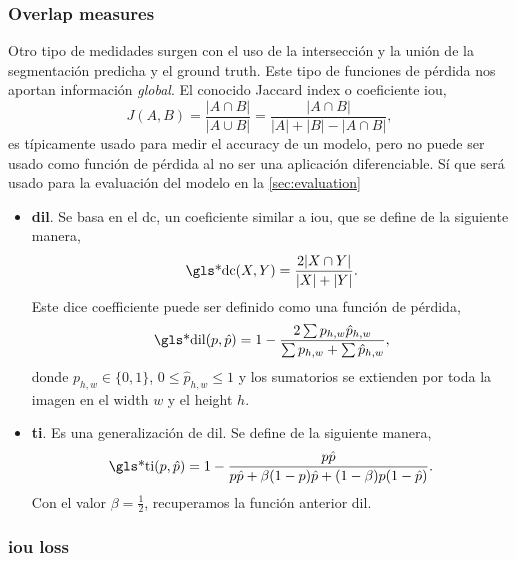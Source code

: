 \subsubsection{Overlap measures}
Otro tipo de medidades surgen con el uso de la intersección y la unión de la
segmentación predicha y el ground truth. Este tipo de funciones de pérdida nos
aportan información \emph{global}. El conocido Jaccard index o coeficiente \gls{iou},
\begin{equation}
  J(A,B) = \frac{|A \cap B|}{|A \cup B|}
  = \frac{|A \cap B|}{|A| + |B| - |A \cap B|},
\end{equation}
es típicamente usado para medir el accuracy de un modelo, pero no puede ser
usado como función de pérdida al no ser una aplicación diferenciable. Sí que
será usado para la evaluación del modelo en la \vref{sec:evaluation}

\begin{itemize}
  \item \textbf{\gls*{dil}}. Se basa en el \gls{dc}, un coeficiente similar a
  \gls{iou}, que se define de la siguiente manera,
  \begin{equation}
    \text{\gls*{dc}}(X, Y) = \frac{2|X \cap Y|}{|X| + |Y|}.
  \end{equation}
  Este dice coefficiente puede ser definido como una función de pérdida,
  \begin{equation}
    \text{\gls*{dil}}(p, \hat{p})
    = 1 - \frac{2\sum p_{h, w}\hat{p}_{h, w}}{\sum p_{h, w} + \sum \hat{p}_{h, w}},
  \end{equation}
  donde \(p_{h, w} \in \{0, 1\}\), \(0 \leq \hat{p}_{h, w} \leq 1\) y los
  sumatorios se extienden por toda la imagen en el width \(w\) y el height
  \(h\).
  \item \textbf{\gls*{ti}}. Es una generalización de \gls{dil}. Se define de la
  siguiente manera,
  \begin{equation}
    \text{\gls*{ti}}(p, \hat{p})
    = 1 - \frac{p\hat{p}}{p\hat{p} + \beta(1 - p)\hat{p} + (1 - \beta)p(1 - \hat{p})}.
  \end{equation}
  Con el valor \(\beta = \frac{1}{2}\), recuperamos la función anterior
  \gls{dil}.
\end{itemize}


\subsubsection{\gls*{iou} loss}

\cite{yu16:unitb}



